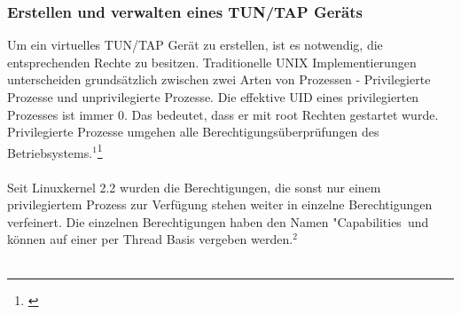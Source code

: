 \subsubsection{Erstellen und verwalten eines TUN/TAP Geräts}
Um ein virtuelles TUN/TAP Gerät zu erstellen, ist es notwendig, die entsprechenden Rechte zu besitzen. Traditionelle UNIX Implementierungen unterscheiden grundsätzlich zwischen zwei Arten von Prozessen -  Privilegierte Prozesse und unprivilegierte Prozesse. Die effektive UID eines privilegierten Prozesses ist immer 0. Das bedeutet, dass er mit root Rechten gestartet wurde. Privilegierte Prozesse umgehen alle Berechtigungsüberprüfungen des Betriebsystems.$^{1}$\footnote[2]{\cite[Vgl.][]{SRV8}}
\\\\
Seit Linuxkernel 2.2 wurden die Berechtigungen, die sonst nur einem privilegiertem Prozess zur Verfügung stehen weiter in einzelne Berechtigungen verfeinert. Die einzelnen Berechtigungen haben den Namen "Capabilities\dq \ und können auf einer per Thread Basis vergeben werden.$^{2}$
\\\\
